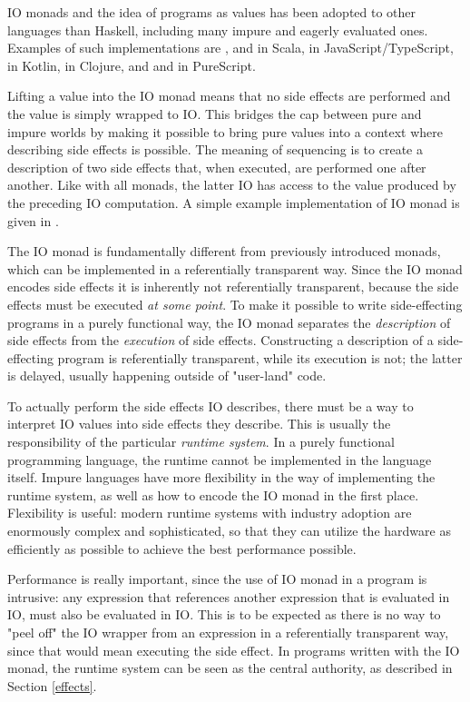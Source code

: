 IO monads and the idea of programs as values has been adopted to other languages than Haskell, including many impure and eagerly evaluated ones. Examples of such implementations are ,  and  in Scala,  in JavaScript/TypeScript,  in Kotlin,  in Clojure, and  and  in PureScript.

Lifting a value into the IO monad means that no side effects are performed and the value is simply wrapped to IO. This bridges the cap between pure and impure worlds by making it possible to bring pure values into a context where describing side effects is possible.
The meaning of sequencing is to create a description of two side effects that, when executed, are performed one after another. Like with all monads, the latter IO has access to the value produced by the preceding IO computation. A simple example implementation of IO monad is given in .



The IO monad is fundamentally different from previously introduced monads, which can be implemented in a referentially transparent way. Since the IO monad encodes side effects it is inherently not referentially transparent, because the side effects must be executed \emph{at some point}. To make it possible to write side-effecting programs in a purely functional way, the IO monad separates the \emph{description} of side effects from the \emph{execution} of side effects. Constructing a description of a side-effecting program is referentially transparent, while its execution is not; the latter is delayed, usually happening outside of "user-land" code.

To actually perform the side effects IO describes, there must be a way to interpret IO values into side effects they describe. This is usually the responsibility of the particular \emph{runtime system}. In a purely functional programming language, the runtime cannot be implemented in the language itself. Impure languages have more flexibility in the way of implementing the runtime system, as well as how to encode the IO monad in the first place. Flexibility is useful: modern runtime systems with industry adoption are enormously complex and sophisticated, so that they can utilize the hardware as efficiently as possible to achieve the best performance possible.

Performance is really important, since the use of IO monad in a program is intrusive: any expression that references another expression that is evaluated in IO, must also be evaluated in IO. This is to be expected as there is no way to "peel off" the IO wrapper from an expression in a referentially transparent way, since that would mean executing the side effect. In programs written with the IO monad, the runtime system can be seen as the central authority, as described in Section \ref{effects}.


